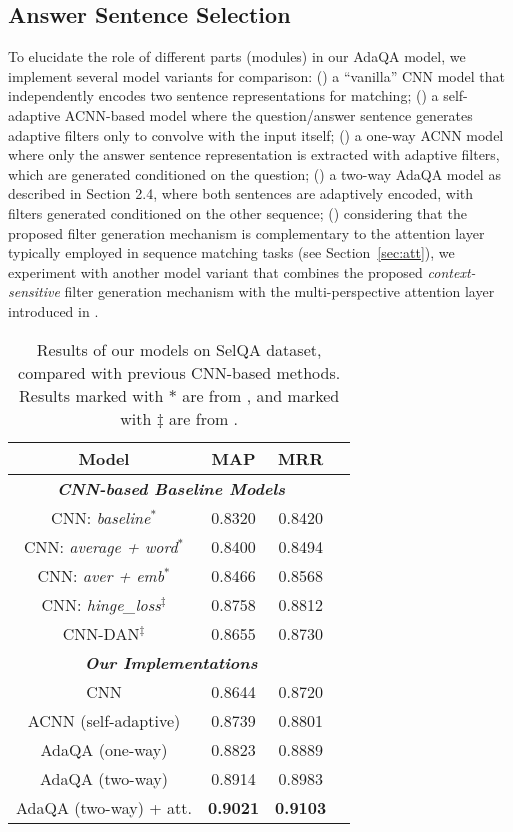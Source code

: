 \documentclass[11pt,a4paper]{article}
\begin{document}
\subsection{Answer Sentence Selection}
\label{sec:exp_qa}
\vspace{-1.5mm}
To elucidate the role of different parts (modules) in our AdaQA model, we implement several model variants for comparison: (\emph{}) a ``vanilla'' CNN model that independently encodes two sentence representations for matching; (\emph{}) a self-adaptive ACNN-based model where the question/answer sentence generates adaptive filters only to convolve with the input itself; (\emph{}) a one-way ACNN model where only the answer sentence representation is extracted with adaptive filters, which are generated conditioned on the question; (\emph{}) a two-way AdaQA model as described in Section 2.4, where both sentences are adaptively encoded, with filters generated conditioned on the other sequence; (\emph{}) considering that the proposed filter generation mechanism is complementary to the attention layer typically employed in sequence matching tasks (see Section~\ref{sec:att}), we experiment with another model variant that combines the proposed \emph{context-sensitive} filter generation mechanism with the multi-perspective attention layer introduced in \cite{wang2017bilateral}. 

\begin{table}
	\centering
	\begin{tabular}{c|c|cc}
		\toprule[1.2pt]
		\textbf{Model} &  \textbf{MAP} &  \textbf{MRR}   \\
		\hline
		\multicolumn{3}{c}{\emph{\textbf{CNN-based Baseline Models}}} \\
		\hline
		CNN: \emph{baseline}$^{\ast}$     & 0.8320 &  0.8420 \\
		CNN: \emph{average + word}$^{\ast}$      & 0.8400 & 0.8494 \\
		CNN: \emph{aver + emb}$^{\ast}$     & 0.8466 & 0.8568 \\
CNN: \emph{hinge\_loss}$^{\ddagger}$     & 0.8758 & 0.8812 \\
		CNN-DAN$^{\ddagger}$    & 0.8655 & 0.8730 \\
		\hline
		\multicolumn{3}{c}{\emph{\textbf{Our Implementations}}} \\
		\hline
		CNN        & 0.8644 & 0.8720 \\
		ACNN (self-adaptive)         & 0.8739 & 0.8801  \\
		AdaQA (one-way)         & 0.8823 & 0.8889  \\ 
		AdaQA (two-way)       & 0.8914 & 0.8983  \\ 
		AdaQA (two-way) + att. & \textbf{0.9021} & \textbf{0.9103}  \\ 
		\bottomrule[1.2pt]
	\end{tabular}
	\caption{\small Results of our models on SelQA dataset, compared with previous CNN-based methods. Results marked with $\ast$ are from \cite{jurczyk2016selqa}, and marked with $\ddagger$ are from \cite{santos2017learning}.}
	\label{tab:selqa}
	\vspace{-6mm}
\end{table}
\end{document}
